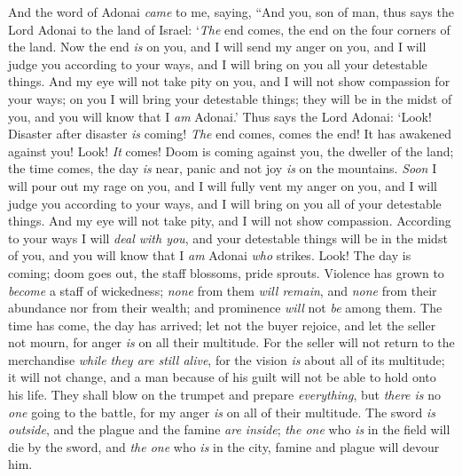 \begin{biblechapter} %
 And the word of Adonai \textit{came} to me, saying,
\verse “And you, son of man, thus says the Lord Adonai to the land of Israel: ‘\textit{The} end comes, the end on the four corners of the land.
\verse Now the end \textit{is} on you, and I will send my anger on you, and I will judge you according to your ways, and I will bring on you all your detestable things.
\verse And my eye will not take pity on you, and I will not show compassion for your ways; on you I will bring your detestable things; they will be in the midst of you, and you will know that I \textit{am} Adonai.’
\verse Thus says the Lord Adonai: ‘Look! Disaster after disaster \textit{is} coming!
\verse \textit{The} end comes, comes the end! It has awakened against you! Look! \textit{It} comes!
\verse Doom is coming against you, the dweller of the land; the time comes, the day \textit{is} near, panic and not joy \textit{is} on the mountains.
\verse \textit{Soon} I will pour out my rage on you, and I will fully vent my anger on you, and I will judge you according to your ways, and I will bring on you all of your detestable things.
\verse And my eye will not take pity, and I will not show compassion. According to your ways I will \textit{deal with you}, and your detestable things will be in the midst of you, and you will know that I \textit{am} Adonai \textit{who} strikes.
\verse Look! The day is coming; doom goes out, the staff blossoms, pride sprouts.
\verse Violence has grown to \textit{become} a staff of wickedness; \textit{none} from them \textit{will remain}, and \textit{none} from their abundance nor from their wealth; and prominence \textit{will} not \textit{be} among them.
\verse The time has come, the day has arrived; let not the buyer rejoice, and let the seller not mourn, for anger \textit{is} on all their multitude.
\verse For the seller will not return to the merchandise \textit{while they are still alive}, for the vision \textit{is} about all of its multitude; it will not change, and a man because of his guilt will not be able to hold onto his life.
\verse They shall blow on the trumpet and prepare \textit{everything}, but \textit{there is} no \textit{one} going to the battle, for my anger \textit{is} on all of their multitude.
\verse The sword \textit{is outside}, and the plague and the famine \textit{are inside}; \textit{the one} who \textit{is} in the field will die by the sword, and \textit{the one} who \textit{is} in the city, famine and plague will devour him.

\end{biblechapter}
